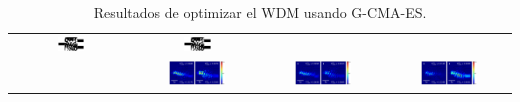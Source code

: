 \begin{landscape}
\begin{table}[ht]
\begin{tabular}{|c|c|c|c|}
      \includegraphics[width=0.24\textwidth]{image/results/wdm/CMA-ES/visualize_eps_disc_512.png} &
      \includegraphics[width=0.24\textwidth]{image/results/wdm/CMA-ES/visualize_eps_fab_512.png} \\
      \cline{2-4}
      &
      \includegraphics[width=0.50\textwidth]{image/results/wdm/CMA-ES/visualize_field_cont_512.png} &
      \includegraphics[width=0.50\textwidth]{image/results/wdm/CMA-ES/visualize_field_disc_512.png} &
      \includegraphics[width=0.50\textwidth]{image/results/wdm/CMA-ES/visualize_field_fab_512.png} \\
    \hline
    \end{tabular}
    \hspace*{-5cm}
    \caption{Resultados de optimizar el WDM usando G-CMA-ES.}
    \label{tab:opt-CMA-wdm}
\end{table}
\end{landscape}

